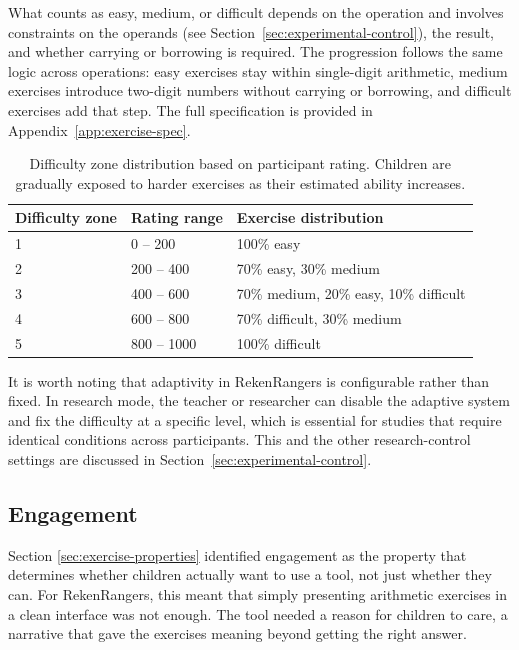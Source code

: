 What counts as easy, medium, or difficult depends on the operation and involves constraints on the operands (see Section~\ref{sec:experimental-control}), the result, and whether carrying or borrowing is required. The progression follows the same logic across operations: easy exercises stay within single-digit arithmetic, medium exercises introduce two-digit numbers without carrying or borrowing, and difficult exercises add that step. The full specification is provided in Appendix~\ref{app:exercise-spec}.

\begin{table}
\centering
\begin{tabular}{lll}
\toprule
Difficulty zone & Rating range & Exercise distribution \\
\midrule
1 & 0 -- 200 & 100\% easy \\
2 & 200 -- 400 & 70\% easy, 30\% medium \\
3 & 400 -- 600 & 70\% medium, 20\% easy, 10\% difficult \\
4 & 600 -- 800 & 70\% difficult, 30\% medium \\
5 & 800 -- 1000 & 100\% difficult \\
\bottomrule
\end{tabular}
\caption{Difficulty zone distribution based on participant rating. Children are gradually exposed to harder exercises as their estimated ability increases.}
\label{tab:difficulty-zones}
\end{table}

It is worth noting that adaptivity in RekenRangers is configurable rather than fixed. In research mode, the teacher or researcher can disable the adaptive system and fix the difficulty at a specific level, which is essential for studies that require identical conditions across participants. This and the other research-control settings are discussed in Section~\ref{sec:experimental-control}.

\subsection{Engagement}
Section \ref{sec:exercise-properties} identified engagement as the property that determines whether children actually want to use a tool, not just whether they can. For RekenRangers, this meant that simply presenting arithmetic exercises in a clean interface was not enough. The tool needed a reason for children to care, a narrative that gave the exercises meaning beyond getting the right answer.


